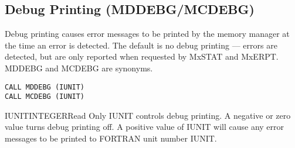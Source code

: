 \subsection{Debug Printing (MDDEBG/MCDEBG)}
Debug printing causes error messages to be printed by the memory manager at
the time an error is detected. The default is no debug printing --- errors
are detected, but are only reported when re\-quest\-ed by MxSTAT and
MxERPT. MDDEBG and MCDEBG are synonyms.
\begin{verbatim}
CALL MDDEBG (IUNIT)
CALL MCDEBG (IUNIT)
\end{verbatim}

\begin{argy}{IUNIT}{INTEGER}{Read Only}
IUNIT controls debug printing. A negative or zero value
turns debug printing off. A positive value of IUNIT will cause any error
messages to be printed to FORTRAN unit number IUNIT.
\end{argy}
